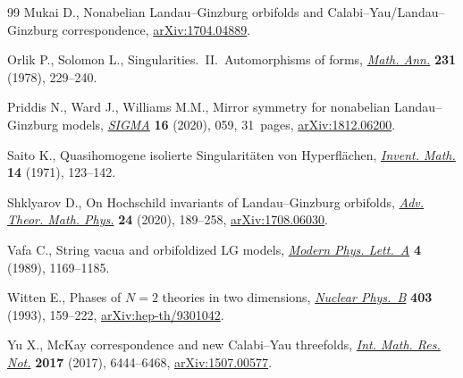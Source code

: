 \documentclass[10pt,a4paper]{amsart}
\numberwithin{equation}{section}
\begin{document}
\begin{thebibliography}{99}
Mukai D., Nonabelian {L}andau--{G}inzburg orbifolds and
 {C}alabi--{Y}au/{L}andau--{G}inzburg correspondence, \href{https://arxiv.org/abs/1704.04889}{arXiv:1704.04889}.

Orlik P., Solomon L., Singularities.~{II}.~{A}utomorphisms of forms,
 \href{https://doi.org/10.1007/BF01420243}{\textit{Math. Ann.}} \textbf{231} (1978), 229--240.

Priddis N., Ward J., Williams M.M., Mirror symmetry for nonabelian
 {L}andau--{G}inzburg models, \href{https://doi.org/10.3842/SIGMA.2020.059}{\textit{SIGMA}} \textbf{16} (2020), 059,
 31~pages, \href{https://arxiv.org/abs/1812.06200}{arXiv:1812.06200}.

Saito K., Quasihomogene isolierte {S}ingularit\"aten von {H}yperfl\"achen,
 \href{https://doi.org/10.1007/BF01405360}{\textit{Invent. Math.}} \textbf{14} (1971), 123--142.

Shklyarov D., On {H}ochschild invariants of {L}andau--{G}inzburg orbifolds,
 \href{https://doi.org/10.4310/ATMP.2020.v24.n1.a6}{\textit{Adv. Theor. Math. Phys.}} \textbf{24} (2020), 189--258,
 \href{https://arxiv.org/abs/1708.06030}{arXiv:1708.06030}.


Vafa C., String vacua and orbifoldized {LG} models, \href{https://doi.org/10.1142/S0217732389001350}{\textit{Modern Phys.
 Lett.~A}} \textbf{4} (1989), 1169--1185.

Witten E., Phases of {$N=2$} theories in two dimensions, \href{https://doi.org/10.1016/0550-3213(93)90033-L}{\textit{Nuclear
 Phys.~B}} \textbf{403} (1993), 159--222, \href{https://arxiv.org/abs/hep-th/9301042}{arXiv:hep-th/9301042}.

Yu X., Mc{K}ay correspondence and new {C}alabi--{Y}au threefolds, \href{https://doi.org/10.1093/imrn/rnv391}{\textit{Int.
 Math. Res. Not.}} \textbf{2017} (2017), 6444--6468, \href{https://arxiv.org/abs/1507.00577}{arXiv:1507.00577}.

\end{thebibliography}
\end{document}
